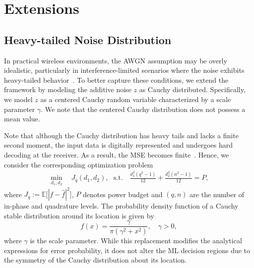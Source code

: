 \documentclass[journal,12pt,onecolumn,draftclsnofoot]{IEEEtran}
\theoremstyle{definition}
\begin{document}
\section{Extensions}\label{sec:general}


\subsection{Heavy-tailed Noise Distribution}\label{sec:heavy-noise}

In practical wireless environments, the AWGN assumption may be overly idealistic, particularly in interference-limited scenarios where the noise exhibits heavy-tailed behavior~\cite{clavier2020experimental}. To better capture these conditions, we extend the framework by modeling the additive noise \( z \) as Cauchy distributed. Specifically, we model \( z \) as a centered Cauchy random variable characterized by a scale parameter \( \gamma \). We note that the centered Cauchy distribution does not possess a mean value.

Note that although the Cauchy distribution has heavy tails and lacks a finite second moment, the input data is digitally represented and undergoes hard decoding at the receiver. As a result, the MSE becomes finite~\cite{chen2023quantizing}. Hence, we consider the corresponding optimization problem 
    \begin{align}
        \min_{d_1, d_2} \quad  J_q(d_1, d_2),~~~ \text{s.t.} \quad  \frac{d_1^2(q^2-1)}{12}+\frac{d_2^2(n^2-1)}{12} = P,
    \end{align}
where $J_q := \mathbb{E}\big[|f-\hat{f}|^2\big]$,  $P$ denotes power budget and $(q,n)$ are the number of in-phase and quadrature levels. The probability density function of a Cauchy stable distribution around its location is given by
\begin{equation}
    f(x) = \frac{\gamma}{\pi (\gamma^2 + x^2)},\quad \gamma >0, 
\end{equation}
where $\gamma$ is the scale parameter. While this replacement modifies the analytical expressions for error probability, it does not alter the ML decision regions due to the symmetry of the Cauchy distribution about its location.
\end{document}
